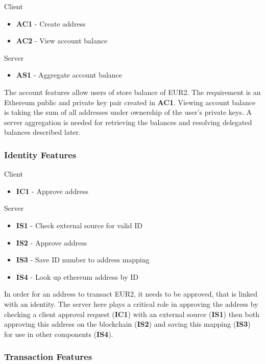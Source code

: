\documentclass[a4paper,12pt]{article} %
\begin{document}
{{Client
\begin{itemize}
	\item \textbf{AC1} - Create address
	\item \textbf{AC2} - View account balance
\end{itemize}

Server
\begin{itemize}
	\item \textbf{AS1} - Aggregate account balance
\end{itemize}

The account features allow users of store balance of EUR2. The requirement is an Ethereum public and private key pair created in \textbf{AC1}. Viewing account balance is taking the sum of all addresses under ownership of the user's private keys. A server aggregation is needed for retrieving the balances and resolving delegated balances described later.

\subsubsection{Identity Features} \label{sssec:3.3:identity}

Client
\begin{itemize}
	\item \textbf{IC1} - Approve address
\end{itemize}

Server
\begin{itemize}
	\item \textbf{IS1} - Check external source for valid ID
	\item \textbf{IS2} - Approve address
	\item \textbf{IS3} - Save ID number to address mapping
	\item \textbf{IS4} - Look up ethereum address by ID
\end{itemize}

In order for an address to transact EUR2, it needs to be approved, that is linked with an identity. The server here plays a critical role in approving the address by checking a client approval request (\textbf{IC1}) with an external source (\textbf{IS1}) then both approving this address on the blockchain (\textbf{IS2}) and saving this mapping (\textbf{IS3}) for use in other components (\textbf{IS4}).

\subsubsection{Transaction Features} \label{sssec:3.3:transactions}

}}
\end{document}
